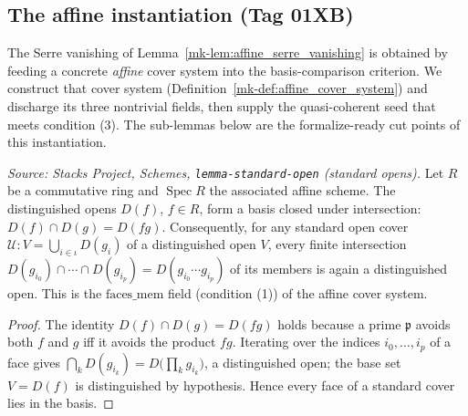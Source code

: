 \subsection{The affine instantiation (Tag 01XB)}

The Serre vanishing of Lemma~\ref{mk-lem:affine_serre_vanishing} is obtained by feeding a concrete
\emph{affine} cover system into the basis-comparison criterion. We construct that cover system
(Definition~\ref{mk-def:affine_cover_system}) and discharge its three nontrivial fields, then supply the
quasi-coherent seed that meets condition (3). The sub-lemmas below are the formalize-ready cut points
of this instantiation.

\begin{lemma}\label{mk-lem:affine_faces_mem}
  \leanok

  \textit{Source: Stacks Project, Schemes, \texttt{lemma-standard-open}
  (standard opens).}
  Let \(R\) be a commutative ring and \(\operatorname{Spec} R\) the associated affine scheme. The
  distinguished opens \(D(f)\), \(f \in R\), form a basis closed under intersection: \(D(f) \cap D(g)
  = D(fg)\). Consequently, for any standard open cover \(\mathcal{U} : V = \bigcup_{i \in \iota}
  D(g_i)\) of a distinguished open \(V\), every finite intersection \(D(g_{i_0}) \cap \cdots \cap
  D(g_{i_p}) = D(g_{i_0} \cdots g_{i_p})\) of its members is again a distinguished open. This is the
  \(\mathrm{faces\_mem}\) field (condition (1)) of the affine cover system.
\end{lemma}
\begin{proof}
  \leanok
  The identity \(D(f) \cap D(g) = D(fg)\) holds because a prime \(\mathfrak{p}\) avoids both \(f\) and
  \(g\) iff it avoids the product \(fg\). Iterating over the indices \(i_0, \ldots, i_p\) of a face
  gives \(\bigcap_k D(g_{i_k}) = D\bigl(\prod_k g_{i_k}\bigr)\), a distinguished open; the base set
  \(V = D(f)\) is distinguished by hypothesis. Hence every face of a standard cover lies in the basis.
\end{proof}

